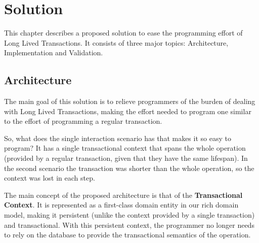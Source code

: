 \chapter{Solution}
\label{chap:solution}

This chapter describes a proposed solution to ease the programming
effort of Long Lived Transactions. It consists of three major topics:
Architecture, Implementation and Validation.

\section{Architecture}

The main goal of this solution is to relieve programmers of the burden
of dealing with Long Lived Transactions, making the effort needed to
program one similar to the effort of programming a regular
transaction.

So, what does the single interaction scenario has that makes it so
easy to program? It has a single transactional context that spans the
whole operation (provided by a regular transaction, given that they
have the same lifespan). In the second scenario the transaction was
shorter than the whole operation, so the context was lost in each
step.

The main concept of the proposed architecture is that of the {\bf
  Transactional Context}. It is represented as a first-class domain
entity in our rich domain model, making it persistent (unlike the
context provided by a single transaction) and transactional. With this
persistent context, the programmer no longer needs to rely on the
database to provide the transactional semantics of the operation.

